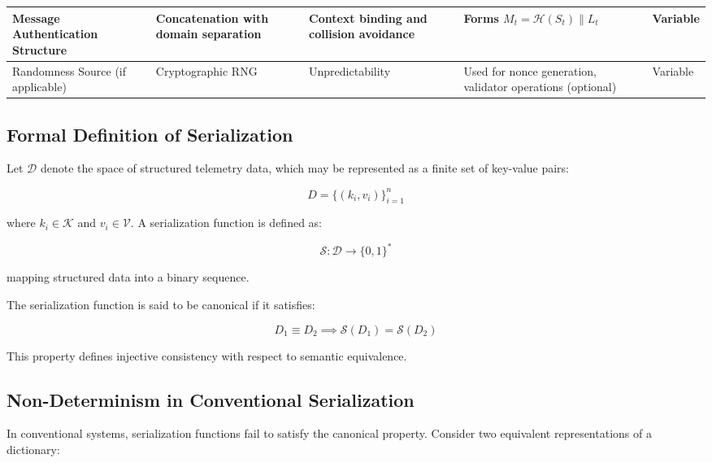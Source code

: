 \begin{table}[htbp]
\begin{tabularx}{\textwidth}{|p{2.8cm}|p{3cm}|X|X|p{2.5cm}|}
\hline

Message Authentication Structure & Concatenation with domain separation & Context binding and collision avoidance & Forms $M_t = \mathcal{H}(S_t) \parallel L_t$ & Variable \\

\hline

Randomness Source (if applicable) & Cryptographic RNG & Unpredictability & Used for nonce generation, validator operations (optional) & Variable \\

\hline

\end{tabularx}
\end{table}

\subsection{Formal Definition of Serialization}

Let $\mathcal{D}$ denote the space of structured telemetry data, which may be represented as a finite set of key-value pairs:

\begin{equation}
D = \{(k_i, v_i)\}_{i=1}^{n}
\end{equation}

where $k_i \in \mathcal{K}$ and $v_i \in \mathcal{V}$. A serialization function is defined as:

\begin{equation}
\mathcal{S}: \mathcal{D} \rightarrow \{0,1\}^*
\end{equation}

mapping structured data into a binary sequence.

The serialization function is said to be canonical if it satisfies:

\begin{equation}
D_1 \equiv D_2 \implies \mathcal{S}(D_1) = \mathcal{S}(D_2)
\end{equation}

This property defines injective consistency with respect to semantic equivalence.

\subsection{Non-Determinism in Conventional Serialization}

In conventional systems, serialization functions fail to satisfy the canonical property. Consider two equivalent representations of a dictionary:

